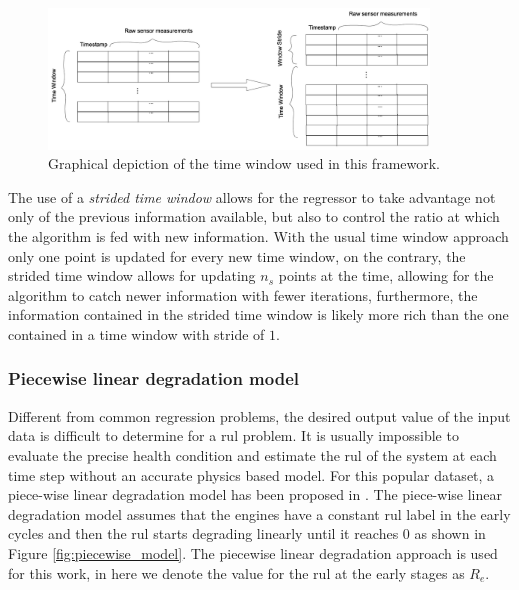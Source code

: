 \begin{figure}[!htb]
\centering
\includegraphics[width=0.9\textwidth]{../img/time_window.png}
\caption{Graphical depiction of the time window used in this framework.}
\label{fig:time_window}
\end{figure}

The use of a \textit{strided time window} allows for the regressor to take advantage not only of the previous information available, but also to control the ratio at which the algorithm is fed with new information. With the usual time window approach only one point is updated for every new time window, on the contrary, the strided time window allows for updating $n_s$ points at the time, allowing for the algorithm to catch newer information with fewer iterations, furthermore, the information contained in the strided time window is likely more rich than the one contained in a time window with stride of $1$.

\subsubsection{Piecewise linear degradation model}

Different from common regression problems, the desired output value of the input data is difficult to determine for a \gls{rul} problem. It is usually impossible to evaluate the precise health condition and estimate the \gls{rul} of the system at each time step without an accurate physics based model. For this popular dataset, a piece-wise linear degradation model has been proposed in \cite{Ramasso2014}. The piece-wise linear degradation model assumes that the engines have a constant \gls{rul} label in the early cycles and then the \gls{rul} starts degrading linearly until it reaches 0 as shown in Figure \ref{fig:piecewise_model}. The piecewise linear degradation approach is used for this work, in here we denote the value for the \gls{rul} at the early stages as $R_e$. 

